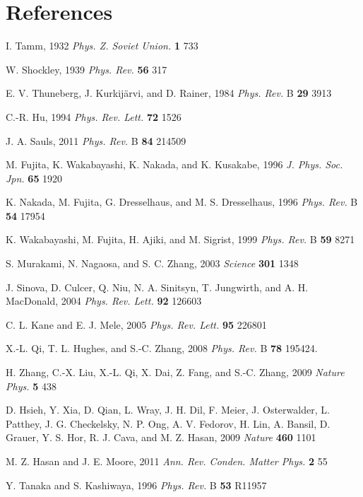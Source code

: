 \documentclass[aps,pra,amsmath,twocolumn,showpacs,bibnotes,10pt]{revtex4-1}
\begin{document}
\section*{References}

\begin{thebibliography}{99}

 I. Tamm, 1932 {\it Phys. Z. Soviet Union.} {\bf 1} 733 

 W. Shockley, 1939 {\it Phys. Rev.} {\bf 56} 317 

 E. V. Thuneberg, J. Kurkij\"arvi, and D. Rainer, 1984 {\it Phys. Rev.} B {\bf 29} 3913

 C.-R. Hu, 1994 {\it Phys. Rev. Lett.} {\bf 72} 1526

 J. A. Sauls, 2011 {\it Phys. Rev.} B {\bf 84} 214509

 M. Fujita, K. Wakabayashi, K. Nakada, and K. Kusakabe, 1996 {\it J. Phys. Soc. Jpn.} {\bf 65} 1920

 K. Nakada, M. Fujita, G. Dresselhaus, and M. S. Dresselhaus, 1996 {\it Phys. Rev.} B {\bf 54} 17954

 K. Wakabayashi, M. Fujita, H. Ajiki, and M. Sigrist, 1999 {\it Phys. Rev.} B {\bf 59} 8271

 S. Murakami, N. Nagaosa, and S. C. Zhang, 2003 {\it Science} {\bf 301} 1348

 J. Sinova, D. Culcer, Q. Niu, N. A. Sinitsyn, T. Jungwirth, and A. H. MacDonald, 2004 {\it Phys. Rev. Lett.} {\bf 92} 126603

 C. L. Kane and E. J. Mele, 2005 {\it Phys. Rev. Lett.} {\bf 95} 226801

 X.-L. Qi, T. L. Hughes, and S.-C. Zhang, 2008 {\it Phys. Rev.} B {\bf 78} 195424.

 H. Zhang, C.-X. Liu, X.-L. Qi, X. Dai, Z. Fang, and S.-C. Zhang, 2009 {\it Nature Phys.} {\bf 5} 438

 D. Hsieh, Y. Xia, D. Qian, L. Wray, J. H. Dil, F. Meier, J. Osterwalder, L. Patthey, J. G. Checkelsky, N. P. Ong, A. V. Fedorov, H. Lin, A. Bansil, D. Grauer, Y. S. Hor, R. J. Cava, and M. Z. Hasan, 2009 {\it Nature} {\bf 460} 1101

 M. Z. Hasan and J. E. Moore, 2011 {\it Ann. Rev. Conden. Matter Phys.} {\bf 2} 55

 Y. Tanaka and S. Kashiwaya, 1996 {\it Phys. Rev.} B {\bf 53} R11957


\end{thebibliography}
\end{document}
